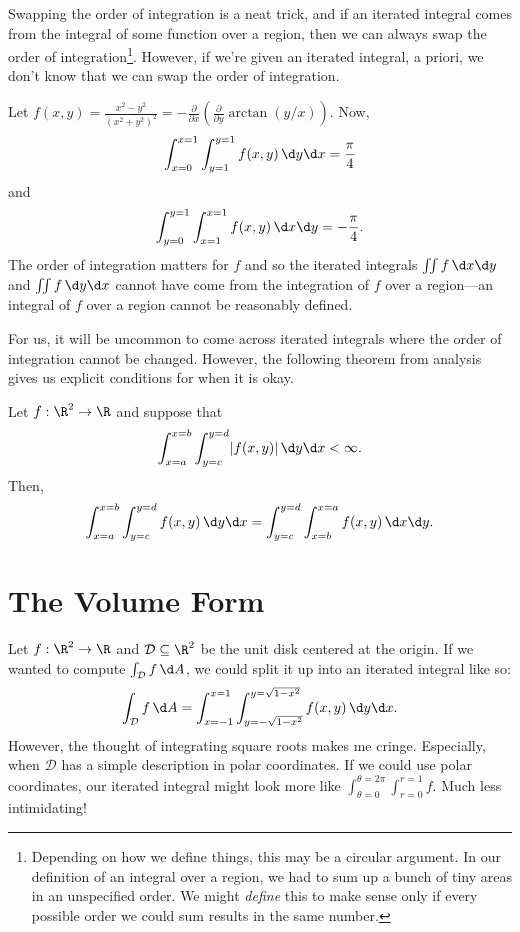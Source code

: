Swapping the order of integration is a neat trick, and if an
iterated integral comes from the integral of some function over a
region, then we can always swap the order of integration\footnote{ Depending
on how we define things, this may be a circular argument.  In our definition
of an integral over a region, we had to sum up a bunch of tiny areas in an unspecified
order.  We might \emph{define} this to make sense only if every possible order we could
sum results in the same number.}.  However, if we're given an iterated integral,
a priori, we don't know that we can swap the order of integration.

\begin{example}
	Let $f(x,y)=\frac{x^2-y^2}{(x^2+y^2)^2} = 
	-\tfrac{\partial}{\partial x}\left(\tfrac{\partial}{\partial y}\arctan(y/x)\right)$.  Now,
	\[
		\int_{x=0}^{x=1}\int_{y=1}^{y=1} f(x,y)\,\d y\d x = \frac{\pi}{4}
	\]
	and
	\[
		\int_{y=0}^{y=1}\int_{x=1}^{x=1} f(x,y)\,\d x\d y = -\frac{\pi}{4}.
	\]
	The order of integration matters for $f$ and so the iterated integrals $\iint f\, \d x\d y$
	and $\iint f\,\d y\d x$ cannot have come from the integration of $f$ over a region---an
	integral of $f$ over a region cannot be reasonably defined.
\end{example}

For us, it will be uncommon to come across iterated integrals where the order of integration
cannot be changed.  However, the following theorem from analysis gives us explicit conditions
for when it is okay.

\begin{theorem}
	Let $f:\R^2\to \R$ and suppose that 
	\[
		\int_{x=a}^{x=b}\int_{y=c}^{y=d} \abs{f(x,y)}\,\d y\d x < \infty.
	\]
	Then,
	\[
		\int_{x=a}^{x=b}\int_{y=c}^{y=d} f(x,y)\,\d y\d x =
		\int_{y=c}^{y=d}\int_{x=b}^{x=a} f(x,y)\,\d x\d y.
	\]
\end{theorem}

\begin{exercises}
\end{exercises}

\section{The Volume Form}

Let $f:\R^2\to \R$ and $\mathcal D\subseteq \R^2$ be the unit disk centered at the origin.
If we wanted to compute $\int_{\mathcal D} f\,\d A$, we could split it up into an iterated
integral like so:
\[
	\int_{\mathcal D} f\,\d A = \int_{x=-1}^{x=1}\int_{y=-\sqrt{1-x^2}}^{y=\sqrt{1-x^2}} f(x,y)\,\d y\d x.
\]
However, the thought of integrating square roots makes me cringe.  Especially, when $\mathcal D$ has
a simple description in polar coordinates.  If we could use polar coordinates, our iterated
integral might look more like $\int_{\theta=0}^{\theta=2\pi}\int_{r=0}^{r=1} f$.  Much less intimidating!

